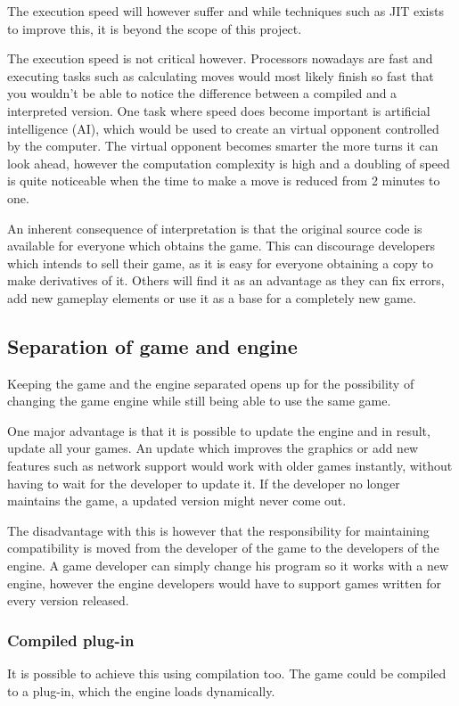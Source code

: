 The execution speed will however suffer and while techniques such as JIT exists to improve this, it is beyond the scope of this project. 

The execution speed is not critical however. 
Processors nowadays are fast and executing tasks such as calculating moves would most likely finish so fast that you wouldn't be able to notice the difference between a compiled and a interpreted version.
One task where speed does become important is artificial intelligence (AI), which would be used to create an virtual opponent controlled by the computer. 
The virtual opponent becomes smarter the more turns it can look ahead, however the computation complexity is high and a doubling of speed is quite noticeable when the time to make a move is reduced from 2 minutes to one.

An inherent consequence of interpretation is that the original source code is available for everyone which obtains the game. This can discourage developers which intends to sell their game, as it is easy for everyone obtaining a copy to make derivatives of it. Others will find it as an advantage as they can fix errors, add new gameplay elements or use it as a base for a completely new game.

\subsection{Separation of game and engine}
\label{subsec:engineseperation}
Keeping the game and the engine separated opens up for the possibility of changing the game engine while still being able to use the same game. 

One major advantage is that it is possible to update the engine and in result, update all your games.
An update which improves the graphics or add new features such as network support would work with older games instantly, without having to wait for the developer to update it.
If the developer no longer maintains the game, a updated version might never come out.

The disadvantage with this is however that the responsibility for maintaining compatibility is moved from the developer of the game to the developers of the engine. A game developer can simply change his program so it works with a new engine, however the engine developers would have to support games written for every version released.

\subsubsection{Compiled plug-in}
It is possible to achieve this using compilation too.
The game could be compiled to a plug-in, which the engine loads dynamically.

